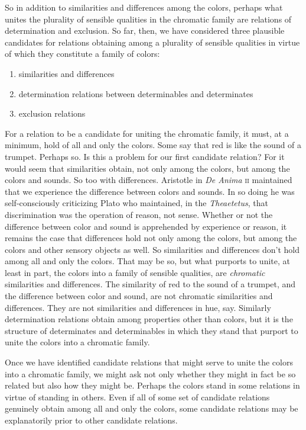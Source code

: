 \documentclass[12pt]{article}
\begin{document}
So in addition to similarities and differences among the colors, perhaps what unites the plurality of sensible qualities in the chromatic family are relations of determination and exclusion. So far, then, we have considered three plausible candidates for relations obtaining among a plurality of sensible qualities in virtue of which they constitute a family of colors:
\begin{enumerate}
	\item similarities and differences
	\item determination relations between determinables and determinates
	\item exclusion relations
\end{enumerate}
For a relation to be a candidate for uniting the chromatic family, it must, at a minimum, hold of all and only the colors. Some say that red is like the sound of a trumpet. Perhaps so. Is this a problem for our first candidate relation? For it would seem that similarities obtain, not only among the colors, but among the colors and sounds. So too with differences. Aristotle in \emph{De Anima} \textsc{ii} maintained that we experience the difference between colors and sounds. In so doing he was self-consciously criticizing Plato who maintained, in the \emph{Theaetetus}, that discrimination was the operation of reason, not sense. Whether or not the difference between color and sound is apprehended by experience or reason, it remains the case that differences hold not only among the colors, but among the colors and other sensory objects as well. So similarities and differences don't hold among all and only the colors. That may be so, but what purports to unite, at least in part, the colors into a family of sensible qualities, are \emph{chromatic} similarities and differences. The similarity of red to the sound of a trumpet, and the difference between color and sound, are not chromatic similarities and differences. They are not similarities and differences in hue, say. Similarly determination relations obtain among properties other than colors, but it is the structure of determinates and determinables in which they stand that purport to unite the colors into a chromatic family.

Once we have identified candidate relations that might serve to unite the colors into a chromatic family, we might ask not only whether they might in fact be so related but also how they might be. Perhaps the colors stand in some relations in virtue of standing in others. Even if all of some set of candidate relations genuinely obtain among all and only the colors, some candidate relations may be explanatorily prior to other candidate relations.
\end{document}
